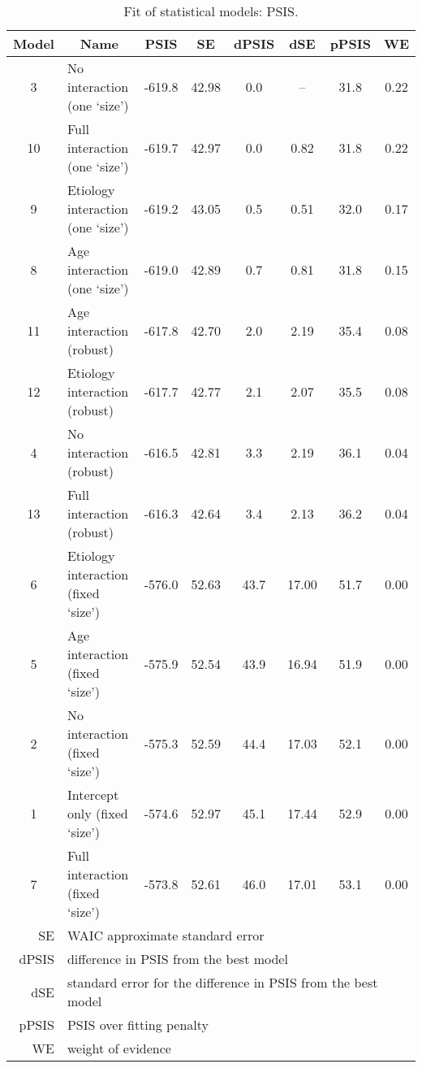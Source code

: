 %
\begin{table}[h!]
	\centering
	\begin{tabular}{|c|lcccccc|} 
		\hline
		Model & \multicolumn{1}{c}{Name} & PSIS & SE & dPSIS & dSE & pPSIS & WE \\[0.5ex] 
		\hline\hline
		\rowcolor{gray}
		3 & No interaction (one `size') & -619.8 & 42.98 & 0.0 & -- & 31.8 & 0.22 \\
		10 & Full interaction (one `size') & -619.7 & 42.97 & 0.0 & 0.82 & 31.8 & 0.22 \\
		\rowcolor{gray}
		9 & Etiology interaction (one `size') & -619.2 & 43.05 & 0.5 & 0.51 & 32.0 & 0.17 \\
		8 & Age interaction (one `size') & -619.0 & 42.89 & 0.7 & 0.81 & 31.8 & 0.15 \\
		\rowcolor{gray}
		11 & Age interaction (robust) & -617.8 & 42.70 & 2.0 & 2.19 & 35.4 & 0.08 \\
		12 & Etiology interaction (robust) & -617.7 & 42.77 & 2.1 & 2.07 & 35.5 & 0.08 \\
		\rowcolor{gray}
		4 & No interaction (robust) & -616.5 & 42.81 & 3.3 & 2.19 & 36.1 & 0.04 \\
		13 & Full interaction (robust) & -616.3 & 42.64 & 3.4 & 2.13 & 36.2 & 0.04 \\
		\rowcolor{gray}
		6 & Etiology interaction (fixed `size') & -576.0 & 52.63 & 43.7 & 17.00 & 51.7 & 0.00 \\
		5 & Age interaction (fixed `size') & -575.9 & 52.54 & 43.9 & 16.94 & 51.9 & 0.00 \\
		\rowcolor{gray}
		2 & No interaction (fixed `size') & -575.3 & 52.59 & 44.4 & 17.03 & 52.1 & 0.00 \\
		1 & Intercept only (fixed `size') & -574.6 & 52.97 & 45.1 & 17.44 & 52.9 & 0.00 \\
		\rowcolor{gray}
		7 & Full interaction (fixed `size') & -573.8 & 52.61 & 46.0 & 17.01 & 53.1 & 0.00 \\
		\hline\hline
		\multicolumn{1}{|r|}{\small SE} & \multicolumn{7}{l|}{\small WAIC approximate standard error} \\
		\multicolumn{1}{|r|}{\small dPSIS} & \multicolumn{7}{l|}{\small difference in PSIS from the best model} \\
		\multicolumn{1}{|r|}{\small dSE} & \multicolumn{7}{l|}{\small standard error for the difference in PSIS from the best model} \\
		\multicolumn{1}{|r|}{\small pPSIS} & \multicolumn{7}{l|}{\small PSIS over fitting penalty} \\
		\multicolumn{1}{|r|}{\small WE} & \multicolumn{7}{l|}{\small weight of evidence} \\
		\hline
	\end{tabular}
	\caption[Fit of statistical models: PSIS]{Fit of statistical models: PSIS.}
	\label{tab:PSIS}
\end{table}
%
%